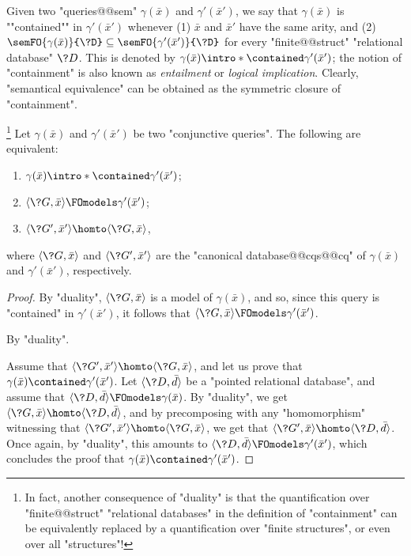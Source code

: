Given two "queries@@sem" $\gamma(\bar x)$ and $\gamma'(\bar x')$,
we say that $\gamma(\bar x)$ is ""contained"" in $\gamma'(\bar x')$
whenever (1) $\bar x$ and $\bar x'$ have the same arity, and (2)
$\semFO{\gamma(\bar x)}{\?D} \subseteq \semFO{\gamma'(\bar x')}{\?D}$
for every "finite@@struct" "relational database" $\?D$. This is denoted by
$\gamma(\bar x) \intro*\contained \gamma'(\bar x')$; the notion
of "containment" is also known as \emph{entailment} or \emph{logical implication}.
Clearly, "semantical equivalence" can be obtained as the symmetric
closure of "containment".

\begin{proposition}
	\!\footnote{In fact, another consequence of "duality" is that
	the quantification over "finite@@struct" "relational databases"
	in the definition of "containment" can be equivalently replaced
	by a quantification over "finite structures", or even over all "structures"!}
	\AP\label{prop:containment-hom}
	Let $\gamma(\bar x)$ and $\gamma'(\bar x')$ be two "conjunctive queries".
	The following are equivalent:
	\begin{enumerate}
		\item $\gamma(\bar x) \intro*\contained \gamma'(\bar x')$;
		\item $\tup{\?G, \bar x} \FOmodels \gamma'(\bar x')$;
		\item $\tup{\?G', \bar x'} \homto \tup{\?G, \bar x}$,
	\end{enumerate}
	where $\tup{\?G, \bar x}$ and $\tup{\?G', \bar x'}$ are the "canonical database@@cqs@@cq"
	of $\gamma(\bar x)$ and $\gamma'(\bar x')$, respectively.
\end{proposition}

\begin{proof}
	By "duality", $\tup{\?G, \bar x}$ is a model of $\gamma(\bar x)$,
	and so, since this query is "contained" in $\gamma'(\bar x')$,
	it follows that $\tup{\?G, \bar x} \FOmodels \gamma'(\bar x')$.

	 By "duality".

	 Assume that
	$\tup{\?G', \bar x'} \homto \tup{\?G, \bar x}$,
	and let us prove that $\gamma(\bar x) \contained \gamma'(\bar x')$.
	Let $\tup{\?D, \bar d}$ be a "pointed relational database",
	and assume that $\tup{\?D, \bar d} \FOmodels \gamma(\bar x)$.
	By "duality", we get $\tup{\?G, \bar x} \homto \tup{\?D, \bar d}$,
	and by precomposing with any "homomorphism" witnessing
	that $\tup{\?G', \bar x'} \homto \tup{\?G, \bar x}$,
	we get that $\tup{\?G', \bar x} \homto \tup{\?D, \bar d}$.
	Once again, by "duality", this amounts to $\tup{\?D, \bar d} \FOmodels \gamma'(\bar x')$,
	which concludes the proof that $\gamma(\bar x) \contained \gamma'(\bar x')$.
\end{proof}

